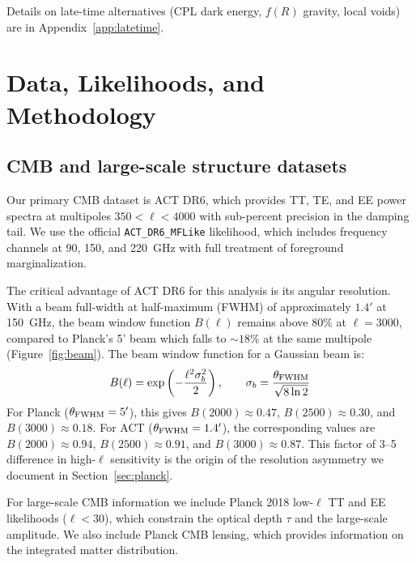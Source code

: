 \documentclass[onecolumn,showpacs,preprintnumbers,amsmath,amssymb,prd]{revtex4-2}
\begin{document}
Details on late-time alternatives (CPL dark energy, $f(R)$ gravity, local voids) 
are in Appendix~\ref{app:latetime}.

\section{Data, Likelihoods, and Methodology}
\label{sec:data}

\subsection{CMB and large-scale structure datasets}

Our primary CMB dataset is ACT DR6, which provides TT, TE, and EE power spectra 
at multipoles $350 < \ell < 4000$ with sub-percent precision in the damping tail. 
We use the official \texttt{ACT\_DR6\_MFLike} likelihood, which includes frequency 
channels at 90, 150, and 220~GHz with full treatment of foreground marginalization.

The critical advantage of ACT DR6 for this analysis is its angular resolution. 
With a beam full-width at half-maximum (FWHM) of approximately $1.4'$ at 150~GHz, 
the beam window function $B(\ell)$ remains above 80\% at $\ell = 3000$, compared 
to Planck's 5' beam which falls to $\sim 18\%$ at the same multipole (Figure~\ref{fig:beam}). 
The beam window function for a Gaussian beam is:
\begin{equation}
B(\ell) = \exp\left(-\frac{\ell^2 \sigma_b^2}{2}\right), \qquad 
\sigma_b = \frac{\theta_{\rm FWHM}}{\sqrt{8\ln 2}}
\label{eq:beam}
\end{equation}
For Planck ($\theta_{\rm FWHM} = 5'$), this gives $B(2000) \approx 0.47$, 
$B(2500) \approx 0.30$, and $B(3000) \approx 0.18$. For ACT ($\theta_{\rm FWHM} = 1.4'$), 
the corresponding values are $B(2000) \approx 0.94$, $B(2500) \approx 0.91$, 
and $B(3000) \approx 0.87$. This factor of 3--5 difference in high-$\ell$ sensitivity 
is the origin of the resolution asymmetry we document in Section~\ref{sec:planck}.

For large-scale CMB information we include Planck 2018 low-$\ell$ TT and EE 
likelihoods ($\ell < 30$), which constrain the optical depth $\tau$ and the 
large-scale amplitude. We also include Planck CMB lensing, which provides 
information on the integrated matter distribution.
\end{document}
